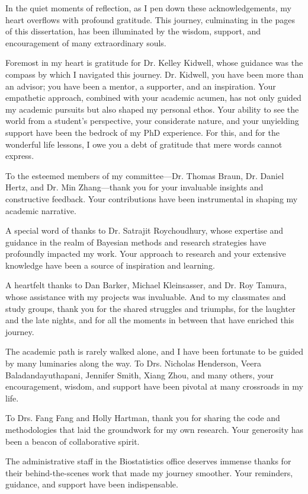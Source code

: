 In the quiet moments of reflection, as I pen down these acknowledgements, my heart overflows with profound gratitude. This journey, culminating in the pages of this dissertation, has been illuminated by the wisdom, support, and encouragement of many extraordinary souls.

Foremost in my heart is gratitude for Dr. Kelley Kidwell, whose guidance was the compass by which I navigated this journey. Dr. Kidwell, you have been more than an advisor; you have been a mentor, a supporter, and an inspiration. Your empathetic approach, combined with your academic acumen, has not only guided my academic pursuits but also shaped my personal ethos. Your ability to see the world from a student's perspective, your considerate nature, and your unyielding support have been the bedrock of my PhD experience. For this, and for the wonderful life lessons, I owe you a debt of gratitude that mere words cannot express.

To the esteemed members of my committee—Dr. Thomas Braun, Dr. Daniel Hertz, and Dr. Min Zhang—thank you for your invaluable insights and constructive feedback. Your contributions have been instrumental in shaping my academic narrative.

A special word of thanks to Dr. Satrajit Roychoudhury, whose expertise and guidance in the realm of Bayesian methods and research strategies have profoundly impacted my work. Your approach to research and your extensive knowledge have been a source of inspiration and learning.

A heartfelt thanks to Dan Barker, Michael Kleinsasser, and Dr. Roy Tamura, whose assistance with my projects was invaluable. And to my classmates and study groups, thank you for the shared struggles and triumphs, for the laughter and the late nights, and for all the moments in between that have enriched this journey.

The academic path is rarely walked alone, and I have been fortunate to be guided by many luminaries along the way. To Drs. Nicholas Henderson, Veera Baladandayuthapani, Jennifer Smith, Xiang Zhou, and many others, your encouragement, wisdom, and support have been pivotal at many crossroads in my life. 

To Drs. Fang Fang and Holly Hartman, thank you for sharing the code and methodologies that laid the groundwork for my own research. Your generosity has been a beacon of collaborative spirit.

The administrative staff in the Biostatistics office deserves immense thanks for their behind-the-scenes work that made my journey smoother. Your reminders, guidance, and support have been indispensable.

